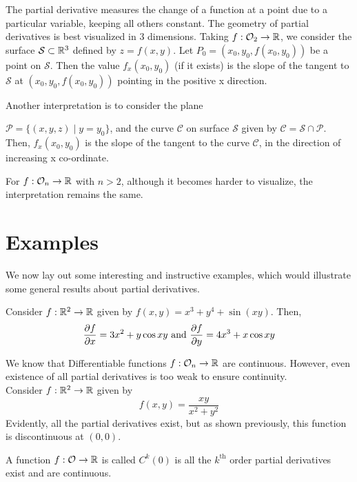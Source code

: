 \documentclass[../Analysis-3.tex]{subfiles}
\begin{document}
The partial derivative measures the change of a function at a point due to a particular variable, keeping all others constant. The geometry of partial derivatives is best visualized in 3 dimensions. Taking $f: \mathcal{O}_{2} \to \mathbb{R}$, we consider the surface $\mathcal{S} \subset \mathbb{R}^3$ defined by $z = f(x,y)$. Let $P_0 = (x_0, y_0, f(x_0, y_0))$ be a point on $\mathcal{S}$. Then the value $f_x(x_0, y_0)$ (if it exists) is the slope of the tangent to $\mathcal{S}$ at $(x_0, y_0, f(x_0, y_0))$ pointing in the positive x direction.

Another interpretation is to consider the plane

$\mathcal{P} = \{(x,y,z) \mid y = y_0\}$, and the curve $\mathcal{C}$ on surface $\mathcal{S}$ given by $\mathcal{C} = \mathcal{S} \cap \mathcal{P}$. Then, $f_x(x_0, y_0)$ is the slope of the tangent to the curve $\mathcal{C}$, in the direction of increasing x co-ordinate.

For $f: \mathcal{O}_{n} \to \mathbb{R}$ with $n > 2$, although it becomes harder to visualize, the interpretation remains the same.

\newpage

\section{Examples}

We now lay out some interesting and instructive examples, which would illustrate some general results about partial derivatives.

\begin{Eg}{}{}
  Consider $f: \mathbb{R}^2 \to \mathbb{R}$ given by $f(x,y) = x^3 + y^4 + \sin(xy)$. Then,
  $$\pdv{f}{x} = 3x^2 + y\cos{xy} \text{ and } \pdv{f}{y} = 4x^3 + x\cos{xy}$$
\end{Eg}

\begin{Eg}{}{}
  We know that Differentiable functions  $f: \mathcal{O}_{n} \to \mathbb{R}$ are continuous. However, even existence of all partial derivatives is too weak to ensure continuity.\\
  Consider $f: \mathbb{R}^2 \to \mathbb{R}$ given by
  $$f(x,y) = \frac{xy}{x^2 + y^2}$$
  Evidently, all the partial derivatives exist, but as shown previously, this function is discontinuous at $(0,0)$.
\end{Eg}

\begin{Def}{}{}
  A function $f: \mathcal{O}_{} \to \mathbb{R}$ is called $C^k(\mathcal{0})$ is all the \( {k}^{\text{th}} \) order partial derivatives exist and are continuous.
\end{Def}
\end{document}
